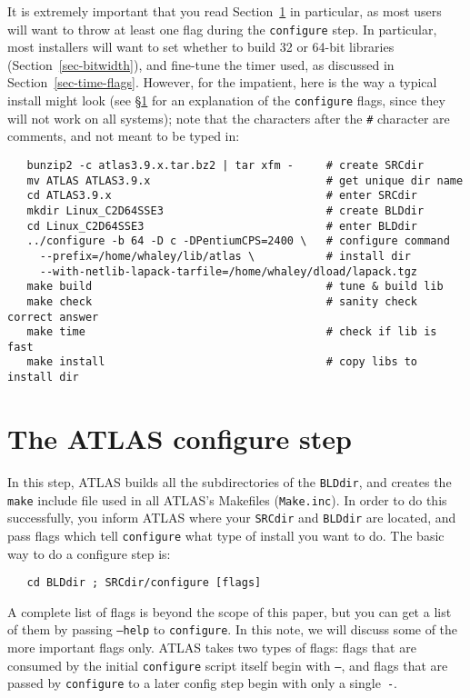\documentclass[11pt]{article}
\begin{document}
It is extremely important that you read Section~\ref{sec-configure} in 
particular, as most users will want to throw at least one flag during
the {\tt configure} step.  In particular, most installers will
want to set whether to build 32 or 64-bit libraries
(Section~\ref{sec-bitwidth}), and fine-tune the timer used, as discussed
in Section~\ref{sec-time-flags}.
However, for the impatient, here is the way a 
typical install might look (see \S\ref{sec-configure} for an explanation
of the {\tt configure} flags, since they will not work on all systems); 
note that the characters after the \verb+#+ character are comments,
and not meant to be typed in:
\begin{verbatim}
   bunzip2 -c atlas3.9.x.tar.bz2 | tar xfm -     # create SRCdir
   mv ATLAS ATLAS3.9.x                           # get unique dir name
   cd ATLAS3.9.x                                 # enter SRCdir
   mkdir Linux_C2D64SSE3                         # create BLDdir
   cd Linux_C2D64SSE3                            # enter BLDdir
   ../configure -b 64 -D c -DPentiumCPS=2400 \   # configure command
     --prefix=/home/whaley/lib/atlas \           # install dir
     --with-netlib-lapack-tarfile=/home/whaley/dload/lapack.tgz
   make build                                    # tune & build lib
   make check                                    # sanity check correct answer
   make time                                     # check if lib is fast
   make install                                  # copy libs to install dir
\end{verbatim}

\section{The ATLAS configure step}
\label{sec-configure}

In this step, ATLAS builds all the subdirectories of the {\tt BLDdir}, and
creates the {\tt make} include file used in all ATLAS's Makefiles 
({\tt Make.inc}).
In order to do this successfully, you inform ATLAS where your 
{\tt SRCdir} and {\tt BLDdir} are located, and pass flags which tell 
{\tt configure}
what type of install you want to do.  The basic way to do a configure step is:
\begin{verbatim}
   cd BLDdir ; SRCdir/configure [flags]
\end{verbatim}

A complete list of flags is beyond the
scope of this paper, but you can get a list of them by passing {\tt --help} to
{\tt configure}.  In this note, we will discuss some of the more important
flags only.  ATLAS takes two types of flags: flags that are consumed by the
initial {\tt configure} script itself begin with {\tt --}, and flags that are
passed by {\tt configure} to a later config step begin with only a 
single~{\tt -}.
\end{document}
